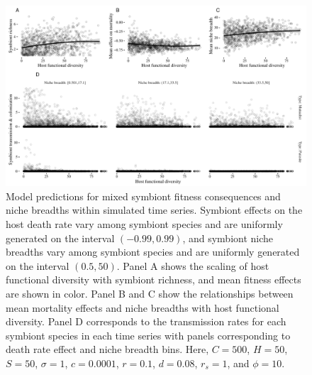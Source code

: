 \documentclass[12pt]{article}
\begin{document}
\begin{figure}[ht]\centering
\includegraphics[width=\textwidth,height=\dimexpr\textheight-4\baselineskip-\abovecaptionskip-\belowcaptionskip\relax,
keepaspectratio]{fig/fig6.pdf}
\caption{Model predictions for mixed symbiont fitness consequences and niche breadths within simulated time series. Symbiont effects on the host death rate vary among symbiont species and are uniformly generated on the interval $(-0.99, 0.99)$, and symbiont niche breadths vary among symbiont species and are uniformly generated on the interval $(0.5, 50)$. Panel A shows the scaling of host functional diversity with symbiont richness, and mean fitness effects are shown in color. Panel B and C show the relationships between mean mortality effects and niche breadths with host functional diversity. Panel D corresponds to the transmission rates for each symbiont species in each time series with panels corresponding to death rate effect and niche breadth bins. Here, $C=500$, $H=50$, $S=50$, $\sigma = 1$, $c=0.0001$, $r=0.1$, $d=0.08$, $r_s=1$, and $\phi = 10$.}
\label{f7}
\end{figure}

\newpage
\end{document}
